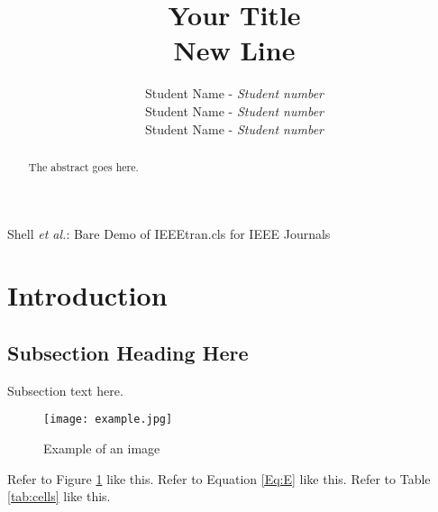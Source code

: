 \documentclass[journal]{IEEEtran}
\begin{document}
\title{Your Title\\ New Line}


\author{Student Name - \textit{Student number}\\
        Student Name - \textit{Student number}\\
        Student Name - \textit{Student number}\\
}

%
{Shell \MakeLowercase{\textit{et al.}}: Bare Demo of IEEEtran.cls for IEEE Journals}%

\maketitle

\begin{abstract}
The abstract goes here.
\end{abstract}

\IEEEpeerreviewmaketitle



\section{Introduction}

\lipsum[10] %



\subsection{Subsection Heading Here}
Subsection text here. 


\begin{figure}[h!]
\centering %
\texttt{[image: example.jpg]} %
\caption{Example of an image}
\label{fig:circ} %
\end{figure}


Refer to Figure \ref{fig:circ} like this. Refer to Equation \ref{Eq:E} like this. Refer to Table \ref{tab:cells} like this.
\end{document}

